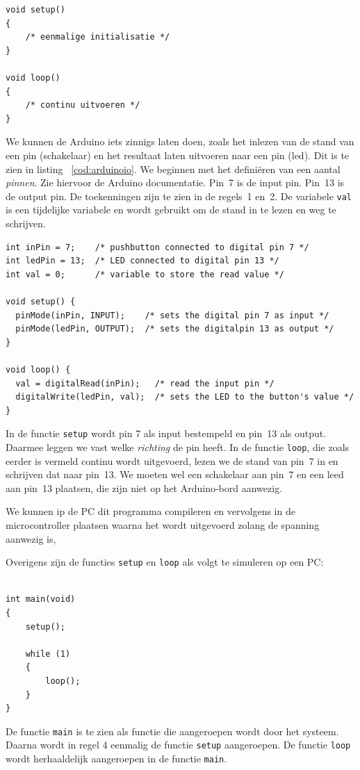 \begin{lstlisting}[caption=Uitvoering op een Adruino Uno.,label=cod:uno]
void setup()
{
    /* eenmalige initialisatie */
}

void loop()
{
    /* continu uitvoeren */
}
\end{lstlisting}

We kunnen de Arduino iets zinnigs laten doen, zoals het inlezen van de stand van een pin (schakelaar) en het resultaat laten uitvoeren naar een pin (led). Dit is te zien in listing~ \ref{cod:arduinoio}. We beginnen met het defini\"eren van een aantal \textsl{pinnen}. Zie hiervoor de Arduino documentatie. Pin~7 is de input pin. Pin~13 is de output pin. De toekenningen zijn te zien in de regels~1 en~2. De variabele \lstinline|val| is een tijdelijke variabele en wordt gebruikt om de stand in te lezen en weg te schrijven.

\begin{lstlisting}[caption={Inlezen van een pin en het resultaat schrijven naar een pin.},label=cod:arduinoio]
int inPin = 7;    /* pushbutton connected to digital pin 7 */
int ledPin = 13;  /* LED connected to digital pin 13 */
int val = 0;      /* variable to store the read value */

void setup() {
  pinMode(inPin, INPUT);    /* sets the digital pin 7 as input */
  pinMode(ledPin, OUTPUT);  /* sets the digitalpin 13 as output */
}

void loop() {
  val = digitalRead(inPin);   /* read the input pin */
  digitalWrite(ledPin, val);  /* sets the LED to the button's value */
}
\end{lstlisting}

In de functie \lstinline|setup| wordt pin 7 als input bestempeld en pin~13 als output. Daarmee leggen we vast welke \textsl{richting} de pin heeft. In de functie \lstinline|loop|, die zoals eerder is vermeld continu wordt uitgevoerd, lezen we de stand van pin~7 in en schrijven dat naar pin~13. We moeten wel een schakelaar aan pin~7 en een leed aan pin~13 plaatsen, die zijn niet op het Arduino-bord aanwezig.

We kunnen ip  de PC dit programma compileren en vervolgens in de microcontroller plaatsen waarna het wordt uitgevoerd zolang de spanning aanwezig is,

Overigens zijn de functies \lstinline|setup| en \lstinline|loop| als volgt te simuleren op een PC:

\begin{lstlisting}[caption=Simulatie van de functies \texttt{setup} en \texttt{loop}.]

int main(void)
{
    setup();

    while (1)
    {
        loop();
    }
}
\end{lstlisting}

De functie \lstinline|main| is te zien als functie die aangeroepen wordt door het systeem. Daarna wordt in regel 4 eenmalig de functie \lstinline|setup| aangeroepen. De functie \lstinline|loop| wordt herhaaldelijk aangeroepen in de functie \lstinline|main|.